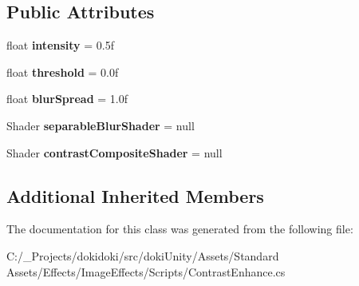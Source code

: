 \subsection*{Public Attributes}
\begin{DoxyCompactItemize}
\item 
float {\bfseries intensity} = 0.\+5f\hypertarget{class_unity_standard_assets_1_1_image_effects_1_1_contrast_enhance_a2c111b940711f3bdc70bbd87dbd8be26}{}\label{class_unity_standard_assets_1_1_image_effects_1_1_contrast_enhance_a2c111b940711f3bdc70bbd87dbd8be26}

\item 
float {\bfseries threshold} = 0.\+0f\hypertarget{class_unity_standard_assets_1_1_image_effects_1_1_contrast_enhance_ac3dfa3fdad364df1349c4a44fde9efba}{}\label{class_unity_standard_assets_1_1_image_effects_1_1_contrast_enhance_ac3dfa3fdad364df1349c4a44fde9efba}

\item 
float {\bfseries blur\+Spread} = 1.\+0f\hypertarget{class_unity_standard_assets_1_1_image_effects_1_1_contrast_enhance_a61052c2aefde0fd4982419fc202e3e67}{}\label{class_unity_standard_assets_1_1_image_effects_1_1_contrast_enhance_a61052c2aefde0fd4982419fc202e3e67}

\item 
Shader {\bfseries separable\+Blur\+Shader} = null\hypertarget{class_unity_standard_assets_1_1_image_effects_1_1_contrast_enhance_ab4a16c1632ba44168d9412b68e8878e9}{}\label{class_unity_standard_assets_1_1_image_effects_1_1_contrast_enhance_ab4a16c1632ba44168d9412b68e8878e9}

\item 
Shader {\bfseries contrast\+Composite\+Shader} = null\hypertarget{class_unity_standard_assets_1_1_image_effects_1_1_contrast_enhance_ae7c1ed29c23cf5ee0599286445d9b9f5}{}\label{class_unity_standard_assets_1_1_image_effects_1_1_contrast_enhance_ae7c1ed29c23cf5ee0599286445d9b9f5}

\end{DoxyCompactItemize}
\subsection*{Additional Inherited Members}


The documentation for this class was generated from the following file\+:\begin{DoxyCompactItemize}
\item 
C\+:/\+\_\+\+Projects/dokidoki/src/doki\+Unity/\+Assets/\+Standard Assets/\+Effects/\+Image\+Effects/\+Scripts/Contrast\+Enhance.\+cs\end{DoxyCompactItemize}

